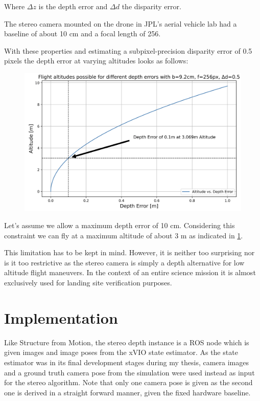 Where $\Delta z$ is the depth error and $\Delta d$ the disparity error.

The stereo camera mounted on the drone in JPL's aerial vehicle lab had a baseline of about 10 cm and a focal length of 256.

With these properties and estimating a subpixel-precision disparity error of 0.5 pixels the depth error at varying altitudes looks as follows:

\begin{figure}
    \centering
    \includegraphics[scale=0.24]{images/stereo_camera_depth/stereo_limit.png}
    \label{fig:stereo_limit}
\end{figure}

Let's assume we allow a maximum depth error of 10 cm. Considering this constraint we can fly at a maximum altitude of about 3 m as indicated in \cref{fig:stereo_limit}.

This limitation has to be kept in mind. However, it is neither too surprising nor is it too restrictive as the stereo camera is simply a depth alternative for low altitude flight maneuvers. In the context of an entire science mission it is almost exclusively used for landing site verification purposes.

\section{Implementation}

Like Structure from Motion, the stereo depth instance is a ROS node which is given images and image poses from the xVIO state estimator. As the state estimator was in its final development stages during my thesis, camera images and a ground truth camera pose from the simulation were used instead as input for the stereo algorithm. Note that only one camera pose is given as the second one is derived in a straight forward manner, given the fixed hardware baseline.

